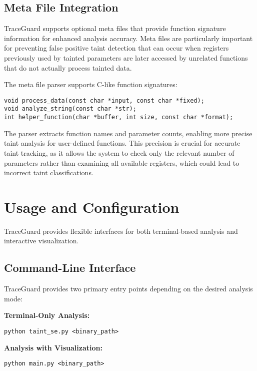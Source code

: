 \subsection{Meta File Integration}

TraceGuard supports optional meta files that provide function signature information for enhanced analysis accuracy. Meta files are particularly important for preventing false positive taint detection that can occur when registers previously used by tainted parameters are later accessed by unrelated functions that do not actually process tainted data.

The meta file parser supports C-like function signatures:

\begin{verbatim}
void process_data(const char *input, const char *fixed);
void analyze_string(const char *str);
int helper_function(char *buffer, int size, const char *format);
\end{verbatim}

The parser extracts function names and parameter counts, enabling more precise taint analysis for user-defined functions. This precision is crucial for accurate taint tracking, as it allows the system to check only the relevant number of parameters rather than examining all available registers, which could lead to incorrect taint classifications.

\section{Usage and Configuration}\label{sec:usage_configuration}

TraceGuard provides flexible interfaces for both terminal-based analysis and interactive visualization.

\subsection{Command-Line Interface}

TraceGuard provides two primary entry points depending on the desired analysis mode:

\textbf{Terminal-Only Analysis:}
\begin{verbatim}
python taint_se.py <binary_path>
\end{verbatim}

\textbf{Analysis with Visualization:}
\begin{verbatim}
python main.py <binary_path>
\end{verbatim}

